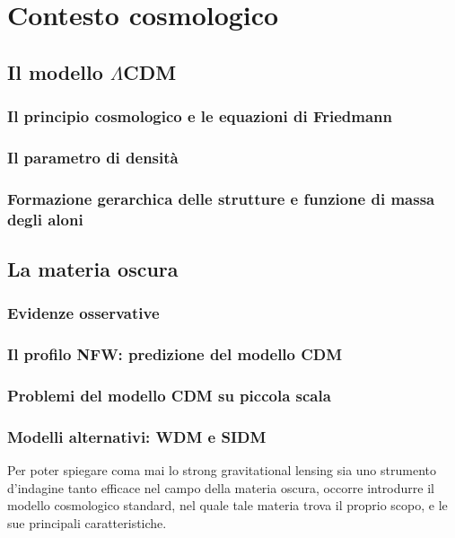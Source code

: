 \chapter{Contesto cosmologico}
\label{cap:cosmologia}

\section{Il modello \texorpdfstring{$\Lambda$CDM}{LambdaCDM}}
\subsection{Il principio cosmologico e le equazioni di Friedmann}
\subsection{Il parametro di densità}
\subsection{Formazione gerarchica delle strutture e funzione di massa degli aloni}
\section{La materia oscura}
\subsection{Evidenze osservative}
\subsection{Il profilo NFW: predizione del modello CDM}
\subsection{Problemi del modello CDM su piccola scala}
\subsection{Modelli alternativi: WDM e SIDM}


Per poter spiegare coma mai lo strong gravitational lensing sia uno strumento d'indagine tanto efficace nel campo della materia oscura, occorre introdurre il modello cosmologico standard, nel quale tale materia trova il proprio scopo, e le sue principali caratteristiche.
